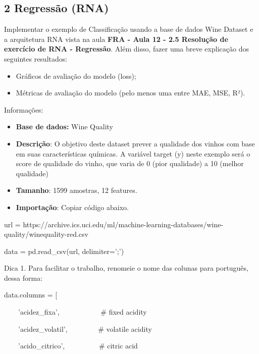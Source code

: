 \subsection*{\textbf{2 Regressão (RNA)}}


Implementar o exemplo de Classificação usando a base de dados Wine Dataset e a arquitetura RNA vista na aula \textbf{FRA
- Aula 12 - 2.5 Resolução de exercício de RNA - Regressão}. Além disso, fazer uma breve explicação dos seguintes
resultados: 

\begin{itemize}
\item Gráficos de avaliação do modelo (loss);
\item Métricas de avaliação do modelo (pelo menos uma entre MAE, MSE, R²).
\end{itemize}
Informações:

\begin{itemize}
\item \textbf{Base de dados: }Wine Quality
\item \textbf{Descrição}: O objetivo deste dataset prever a qualidade dos vinhos com base em suas características
químicas. A variável target (y) neste exemplo será o score de qualidade do vinho, que varia de 0 (pior qualidade) a 10
(melhor qualidade)
\item \textbf{Tamanho}: 1599 amostras, 12 features.
\end{itemize}
\begin{itemize}
\item \textbf{Importação}: Copiar código abaixo.
\end{itemize}

\foreignlanguage{english}{\textcolor[HTML]{188038}{url =
{\textquotedbl}https://archive.ics.uci.edu/ml/machine-learning-databases/wine-quality/winequality-red.csv{\textquotedbl}}}

\textcolor[HTML]{188038}{data = pd.read\_csv(url, delimiter=';')}


\textcolor[HTML]{188038}{Dica 1. Para facilitar o trabalho, renomeie o nome das colunas para português, dessa forma:}


\textcolor[HTML]{188038}{data.columns = [}

\textcolor[HTML]{188038}{\ \ \ \ {}'acidez\_fixa', \ \ \ \ \ \ \ \ \ \ \ \# fixed acidity}

\textcolor[HTML]{188038}{\ \ \ \ {}'acidez\_volatil', \ \ \ \ \ \ \ \ \# volatile acidity}

\textcolor[HTML]{188038}{\ \ \ \ {}'acido\_citrico', \ \ \ \ \ \ \ \ \ \# citric acid}

